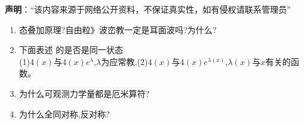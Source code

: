 
\textbf{声明}：“该内容来源于网络公开资料，不保证真实性，如有侵权请联系管理员”

\begin{enumerate}
\item 态叠加原理?自由粒》波峦教一定是耳面波吗?为什么?
\item 下面表述 的是否是同一状态\\
(1)$4(x)$与$4(x)e^\lambda$,$\lambda$为应常教,(2)$4(x)$与$4(x)e^{\lambda(x)}$,$\lambda(x)$与$x$有关的函数。
\item 为什么可观测力学量都是厄米算符?
\item 为什么全同对称,反对称?
\end{enumerate}